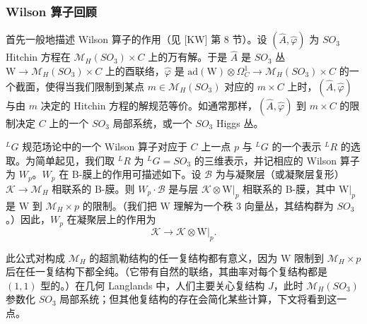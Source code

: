 \documentclass[11pt,a4paper]{article}
\begin{document}
\subsubsection{Wilson 算子回顾}

首先一般地描述 Wilson 算子的作用（见 [KW] 第 8 节）。设 $(\widehat{A},\widehat{\varphi})$ 为 $SO_3$
Hitchin 方程在 $\mathcal{M}_H(SO_3)\times C$ 上的万有解。于是 $\widehat{A}$ 是 $SO_3$ 丛 $\mathrm{W}\to\mathcal{M}_H(SO_3)\times C$ 上的酉联络，$\widehat{\varphi}$ 是 $\mathrm{ad}(\mathrm{W})\otimes\Omega^1_C\to\mathcal{M}_H(SO_3)\times C$ 的一个截面，使得当我们限制到某点 $m\in\mathcal{M}_H(SO_3)$ 对应的 $m\times C$ 上时，$(\widehat{A},\widehat{\varphi})$ 与由 $m$ 决定的 Hitchin 方程的解规范等价。如通常那样，$(\widehat{A},\widehat{\varphi})$ 到 $m\times C$ 的限制决定 $C$ 上的一个 $SO_3$ 局部系统，或一个 $SO_3$ Higgs 丛。

${}^{L}G$ 规范场论中的一个 Wilson 算子对应于 $C$ 上一点 $p$ 与 ${}^{L}G$ 的一个表示 ${}^{L}R$ 的选取。为简单起见，我们取 ${}^{L}R$ 为 ${}^{L}G=SO_3$ 的三维表示，并记相应的 Wilson 算子为 $W_p$。$W_p$ 在 B-膜上的作用可描述如下。设 $\mathcal{B}$ 为与凝聚层（或凝聚层复形）$\mathcal{K}\to\mathcal{M}_H$ 相联系的 B-膜。则 $W_p\cdot\mathcal{B}$ 是与层 $\mathcal{K}\otimes\mathrm{W}|_p$ 相联系的 B-膜，其中 $\mathrm{W}|_p$ 是 $\mathrm{W}$ 到 $\mathcal{M}_H\times p$ 的限制。（我们把 $\mathrm{W}$ 理解为一个秩 3 向量丛，其结构群为 $SO_3$。）因此，$W_p$ 在凝聚层上的作用为
\begin{equation}\tag{5.17}
\mathcal{K}\to\mathcal{K}\otimes\mathrm{W}|_p.
\end{equation}


此公式对构成 $\mathcal{M}_H$ 的超凯勒结构的任一复结构都有意义，因为 $\mathrm{W}$ 限制到 $\mathcal{M}_H\times p$ 后在任一复结构下都全纯。（它带有自然的联络，其曲率对每个复结构都是 $(1,1)$ 型的。）在几何 Langlands 中，人们主要关心复结构 $J$，此时 $\mathcal{M}_H(SO_3)$ 参数化 $SO_3$ 局部系统；但其他复结构的存在会简化某些计算，下文将看到这一点。
\end{document}
